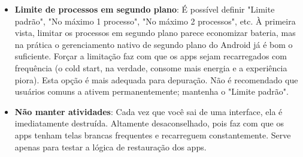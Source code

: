 \begin{itemize}
  \item \textbf{Limite de processos em segundo plano}: É possível definir "Limite padrão", "No máximo 1 processo", "No máximo 2 processos", etc. À primeira vista, limitar os processos em segundo plano parece economizar bateria, mas na prática o gerenciamento nativo de segundo plano do Android já é bom o suficiente. Forçar a limitação faz com que os apps sejam recarregados com frequência (o cold start, na verdade, consome mais energia e a experiência piora). Esta opção é mais adequada para depuração. Não é recomendado que usuários comuns a ativem permanentemente; mantenha o "Limite padrão".
  \item \textbf{Não manter atividades}: Cada vez que você sai de uma interface, ela é imediatamente destruída. Altamente desaconselhado, pois faz com que os apps tenham telas brancas frequentes e recarreguem constantemente. Serve apenas para testar a lógica de restauração dos apps.
\end{itemize}

